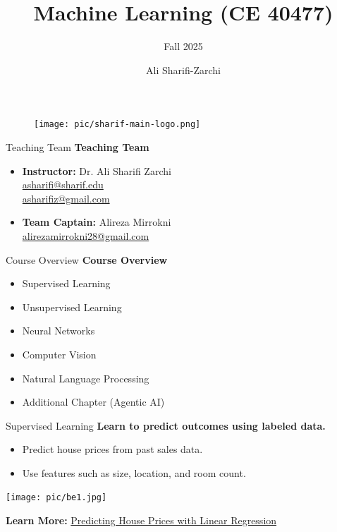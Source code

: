 \documentclass[serif, aspectratio=169]{beamer}
\author{Ali Sharifi-Zarchi}
\title{Machine Learning (CE 40477)}
\subtitle{Fall 2025}
\institute{
    CE Department \\
    Sharif University of Technology
}
\begin{document}
\begin{frame}
    \titlepage
    \vspace*{-0.6cm}
    \begin{figure}[htpb]
    \begin{center}
        \texttt{[image: pic/sharif-main-logo.png]}
    \end{center}
\end{figure}

\end{frame}


\begin{frame}{Teaching Team}
\textbf{Teaching Team}
\begin{itemize}
    \item \textbf{Instructor:} Dr. Ali Sharifi Zarchi \\
          \href{mailto:asharifi@sharif.edu}{asharifi@sharif.edu} \\
          \href{mailto:asharifiz@gmail.com}{asharifiz@gmail.com}
    \item \textbf{Team Captain:} Alireza Mirrokni \\
          \href{mailto:alirezamirrokni28@gmail.com}{alirezamirrokni28@gmail.com}
\end{itemize}


\end{frame}


\begin{frame}{Course Overview}
\textbf{Course Overview}
\begin{itemize}
    \item Supervised Learning
    \item Unsupervised Learning
    \item Neural Networks
    \item Computer Vision
    \item Natural Language Processing
    \item Additional Chapter (Agentic AI)
\end{itemize}
\end{frame}




\begin{frame}{Supervised Learning}
\textbf{Learn to predict outcomes using labeled data.}

\begin{itemize}
    \item Predict house prices from past sales data.
    \item Use features such as size, location, and room count.
\end{itemize}


\begin{center}
    \centering
    \texttt{[image: pic/be1.jpg]}
\end{center}

\textbf{Learn More:}
\href{https://towardsdatascience.com/predicting-house-prices-with-linear-regression-machine-learning-from-scratch-part-ii-47a0238aeac1}{Predicting House Prices with Linear Regression}
\end{frame}
\end{document}
